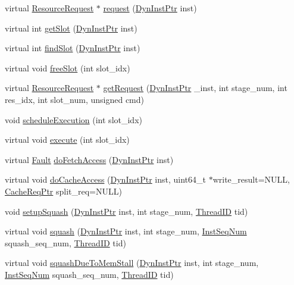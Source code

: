 \begin{DoxyCompactItemize}
\item 
virtual \hyperlink{classResourceRequest}{ResourceRequest} $\ast$ \hyperlink{classResource_acd38b2c94092af431807b57f7b7cef6c}{request} (\hyperlink{classRefCountingPtr}{DynInstPtr} inst)
\item 
virtual int \hyperlink{classResource_ab3ba2ee95c723c8c056db0a1f2a6dfd3}{getSlot} (\hyperlink{classRefCountingPtr}{DynInstPtr} inst)
\item 
virtual int \hyperlink{classResource_a990f82d45376225d628def316f024f6b}{findSlot} (\hyperlink{classRefCountingPtr}{DynInstPtr} inst)
\item 
virtual void \hyperlink{classResource_a19ec1254d9f9be5b3058fad36034f7da}{freeSlot} (int slot\_\-idx)
\item 
virtual \hyperlink{classResourceRequest}{ResourceRequest} $\ast$ \hyperlink{classResource_aae5ce84f94a1057d7f60172daf5d731d}{getRequest} (\hyperlink{classRefCountingPtr}{DynInstPtr} \_\-inst, int stage\_\-num, int res\_\-idx, int slot\_\-num, unsigned cmd)
\item 
void \hyperlink{classResource_a9f90c5efcf202dda43bb780a645bee1f}{scheduleExecution} (int slot\_\-idx)
\item 
virtual void \hyperlink{classResource_a39af49c5568d1db3f53c12d7d6914c32}{execute} (int slot\_\-idx)
\item 
virtual \hyperlink{classRefCountingPtr}{Fault} \hyperlink{classResource_a04a5d185526d3121fee572712fe353ad}{doFetchAccess} (\hyperlink{classRefCountingPtr}{DynInstPtr} inst)
\item 
virtual void \hyperlink{classResource_aa874bbb279acf67627511df8f4c3dce5}{doCacheAccess} (\hyperlink{classRefCountingPtr}{DynInstPtr} inst, uint64\_\-t $\ast$write\_\-result=NULL, \hyperlink{classCacheRequest}{CacheReqPtr} split\_\-req=NULL)
\item 
void \hyperlink{classResource_ab03920cf8ee0a1dd131d4a6db0320f71}{setupSquash} (\hyperlink{classRefCountingPtr}{DynInstPtr} inst, int stage\_\-num, \hyperlink{base_2types_8hh_ab39b1a4f9dad884694c7a74ed69e6a6b}{ThreadID} tid)
\item 
virtual void \hyperlink{classResource_a52235c5e3d912452f254dc45f1496fd2}{squash} (\hyperlink{classRefCountingPtr}{DynInstPtr} inst, int stage\_\-num, \hyperlink{inst__seq_8hh_a258d93d98edaedee089435c19ea2ea2e}{InstSeqNum} squash\_\-seq\_\-num, \hyperlink{base_2types_8hh_ab39b1a4f9dad884694c7a74ed69e6a6b}{ThreadID} tid)
\item 
virtual void \hyperlink{classResource_ae2d6fba25ece343caad6eb029a4a3b5b}{squashDueToMemStall} (\hyperlink{classRefCountingPtr}{DynInstPtr} inst, int stage\_\-num, \hyperlink{inst__seq_8hh_a258d93d98edaedee089435c19ea2ea2e}{InstSeqNum} squash\_\-seq\_\-num, \hyperlink{base_2types_8hh_ab39b1a4f9dad884694c7a74ed69e6a6b}{ThreadID} tid)

\end{DoxyCompactItemize}
